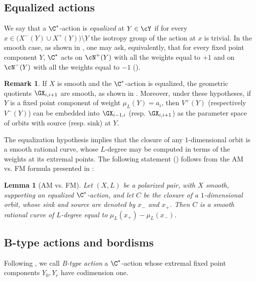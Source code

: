 \documentclass[reqno]{amsproc}
\newtheorem{lemma}[theorem]{Lemma}
\theoremstyle{definition}
\newtheorem{remark}[theorem]{Remark}
\begin{document}

\subsection{Equalized actions}\label{wors6:sssec:equal}

We say that a $\C^*$-action  is {\em  equalized} at $Y\in\cY$ if for every $x\in \big(X^{-}(Y)\cup X^{+}(Y)\big)\setminus Y$ the isotropy group of the action at $x$ is trivial. In the smooth case,  as shown in \cite[Lemma 2.1]{wors6-WORS3}, one may ask, equivalently, that for
every  fixed point component 
$Y$, $\C^*$ acts on $\cN^+(Y)$ with all the weights equal to $+1$ and on $\cN^-(Y)$ with all the weights equal to $-1$ (\cite[Definition 1]{wors6-RW}). 

\begin{remark}\label{wors6:rem:normalquot}
If $X$ is smooth and the $\C^*$-action is equalized, the geometric quotients $\GX_{i,i+1}$ are smooth, as shown in  \cite[Lemma 2.15]{wors6-WORS3}. Moreover, under these hypotheses, if $Y$ is a fixed point component of weight $\mu_L(Y)=a_i$, then  $V^+(Y)$ (respectively $V^-(Y)$) can be embedded into $\GX_{i-1,i}$  (resp. $\GX_{i,i+1}$) as the parameter space of orbits with source (resp. sink) at $Y$.
\end{remark}

The equalization hypothesis implies that the closure of any $1$-dim\-ens\-ional orbit is a smooth rational curve, whose $L$-degree may be computed in terms of the weights at its extremal points. 
The following statement (\cite[Lemma 2.2]{wors6-WORS3}) follows from the AM vs. FM formula presented in \cite[Corollary 3.2]{wors6-RW}: 

\begin{lemma}[AM vs. FM]\label{wors6:lem:AMFM}
Let $(X,L)$ be a polarized pair, with $X$ smooth, supporting an equalized $\C^*$-action, and let $C$ be the closure of a $1$-dimensional orbit, whose sink and source are denoted by $x_-$ and $x_+$. Then $C$ is a smooth rational curve of $L$-degree  equal to $\mu_L(x_+)-\mu_L(x_-)$.
\end{lemma} 

\subsection{B-type actions and bordisms}\label{wors6:sssec:btype} 
Following \cite[Section 3]{wors6-WORS1}, we call  {\em B-type action} a $\C^*$-action whose extremal fixed point components $Y_0,Y_r$ have codimension one. 
\end{document}
